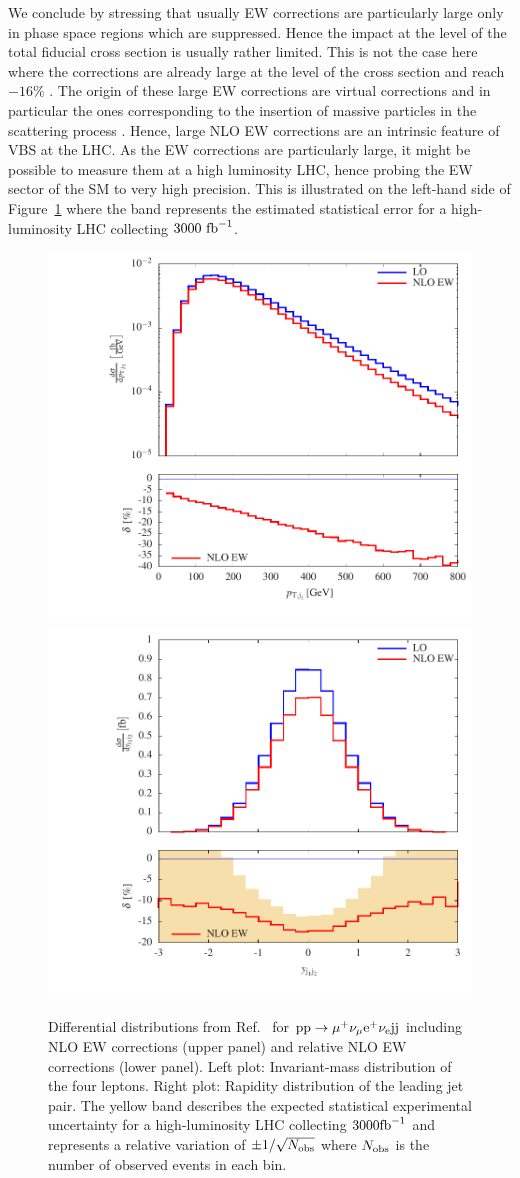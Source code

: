 We conclude by stressing that usually EW corrections are particularly large only in phase space regions which are suppressed.
Hence the impact at the level of the total fiducial cross section is usually rather limited.
This is not the case here where the corrections are already large at the level of the cross section and reach $-16\%$ \cite{Biedermann:2016yds}.
The origin of these large EW corrections are virtual corrections and in particular the ones corresponding to the insertion of massive particles in the scattering process \cite{Biedermann:2016yds}.
Hence, large NLO EW corrections are an intrinsic feature of VBS at the LHC.
As the EW corrections are particularly large, it might be possible to measure them at a high luminosity LHC, hence probing the EW sector of the SM to very high precision.
This is illustrated on the left-hand side of Figure~\ref{fig:VBSEW} where the band represents the estimated statistical error for a high-luminosity LHC collecting $3000~{\rm fb}^{-1}$.

\begin{figure}
\includegraphics[width=.47\textwidth]{WG1_plots/histogram_transverse_momentum_j1_ew}
\includegraphics[width=.47\textwidth]{WG1_plots/histogram_rapidity_j1j2_ew}
\caption{Differential distributions from Ref.~\cite{Biedermann:2016yds} for ${\rm p}{\rm p}\to\mu^+\nu_\mu{\rm e}^+\nu_{\rm e}{\rm j}{\rm j}$ including NLO EW corrections (upper panel) and relative NLO EW corrections (lower panel).
Left plot: Invariant-mass distribution of the four leptons.
Right plot: Rapidity distribution of the leading jet pair.
The yellow band describes the expected statistical experimental uncertainty for a high-luminosity LHC collecting $3000{\rm fb}^{-1}$ and represents a relative variation of $\pm 1/\sqrt{N_{\rm obs}}$ where $N_{\rm obs}$ is the number of observed events in each bin.}
\label{fig:VBSEW}
\end{figure}

